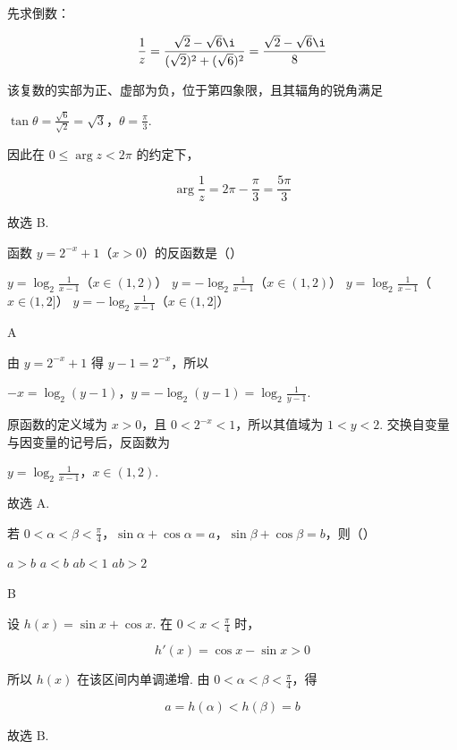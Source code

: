 \begin{solution}
先求倒数：

\[
\frac{1}{z}=\frac{\sqrt{2}-\sqrt{6}\i}{(\sqrt{2})^2+(\sqrt{6})^2}=\frac{\sqrt{2}-\sqrt{6}\i}{8}
\]

该复数的实部为正、虚部为负，位于第四象限，且其辐角的锐角满足

\(\tan\theta=\frac{\sqrt{6}}{\sqrt{2}}=\sqrt{3}\)，\(\theta=\frac{\pi}{3}\).

因此在 \(0\leqslant\arg z<2\pi\) 的约定下，

\[
\arg\frac{1}{z}=2\pi-\frac{\pi}{3}=\frac{5\pi}{3}
\]

故选 B.
\end{solution}

\begin{problem}
函数 \(y = 2^{-x} + 1\)（\(x > 0\)）的反函数是（\quad）

\choices
    {\(y = \log_2 \frac{1}{x - 1}\)（\(x \in (1, 2)\)）}
    {\(y = -\log_2 \frac{1}{x - 1}\)（\(x \in (1, 2)\)）}
    {\(y = \log_2 \frac{1}{x - 1}\)（\(x \in (1, 2]\)）}
    {\(y = -\log_2 \frac{1}{x - 1}\)（\(x \in (1, 2]\)）}
\end{problem}

\begin{answer}
A
\end{answer}

\begin{solution}
由 \(y=2^{-x}+1\) 得 \(y-1=2^{-x}\)，所以

\(-x=\log_2(y-1)\)，\(y=-\log_2(y-1)=\log_2\frac{1}{y-1}\).

原函数的定义域为 \(x>0\)，且 \(0<2^{-x}<1\)，所以其值域为 \(1<y<2\). 交换自变量与因变量的记号后，反函数为

\(y=\log_2\frac{1}{x-1}\)，\(x\in(1,2)\).

故选 A.
\end{solution}

\begin{problem}
若 \(0 < \alpha < \beta < \frac{\pi}{4}\)，\(\sin \alpha + \cos \alpha = a\)，\(\sin \beta + \cos \beta = b\)，则（\quad）

\choices
    {\(a > b\)}
    {\(a < b\)}
    {\(ab < 1\)}
    {\(ab > 2\)}
\end{problem}

\begin{answer}
B
\end{answer}

\begin{solution}
设 \(h(x)=\sin x+\cos x\). 在 \(0<x<\frac{\pi}{4}\) 时，

\[
h'(x)=\cos x-\sin x>0
\]

所以 \(h(x)\) 在该区间内单调递增. 由 \(0<\alpha<\beta<\frac{\pi}{4}\)，得

\[
a=h(\alpha)<h(\beta)=b
\]

故选 B.
\end{solution}

